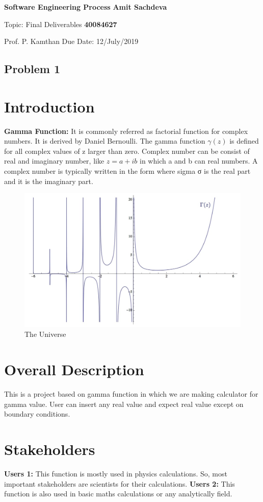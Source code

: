 \documentclass{article}
\begin{document}
\noindent
\large\textbf{Software Engineering Process} \hfill \textbf{Amit Sachdeva} 

\normalsize Topic: Final Deliverables \hfill \textbf{40084627} 

Prof. P. Kamthan \hfill Due Date: 12/July/2019
\begin{center}
    \section*{Problem 1}
\end{center}
\section{Introduction} 
\textbf{Gamma Function: } It is commonly referred as factorial function for complex numbers. It is derived by Daniel Bernoulli. The gamma function $\gamma(z)$ is defined for all complex values of z larger than zero. Complex number can be consist of real and imaginary number, like $z = a + ib$ in which a and b can real numbers. A complex number is typically written in the form where sigma σ is the real part and it is the imaginary part.
\begin{figure}[h!]
\centering
\includegraphics[scale=0.4]{gamma1}
\caption{The Universe}
\label{fig:Gamma Function}
\end{figure}
\section{Overall Description} 
This is a project based on gamma function in which we are making calculator for gamma value. User can insert any real value and expect real value except on boundary conditions.

\section{Stakeholders} 
\textbf{Users 1:} This function is mostly used in physics calculations. So, most important stakeholders are scientists for their calculations.
\newline
\textbf{Users 2:} This function is also used in basic maths calculations or any analytically field. 
\end{document}
